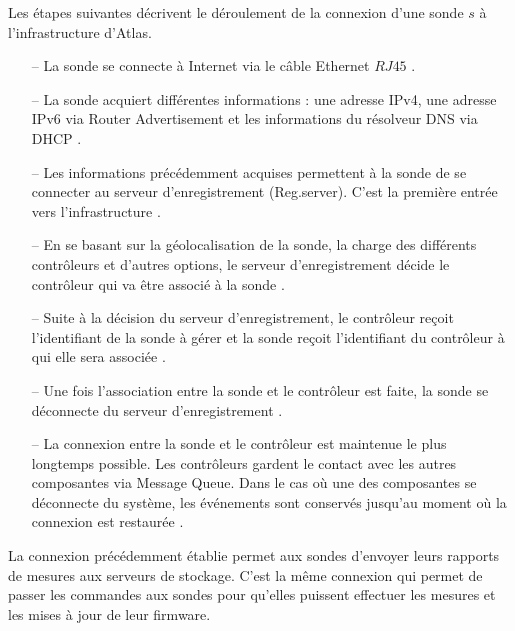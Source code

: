 Les étapes suivantes décrivent le déroulement de la connexion d'une sonde  $s$ à l'infrastructure  d'Atlas. 
\begin{itemize}
	\item[--] La sonde  se connecte à Internet via  le câble Ethernet $RJ45$ .
	\item[--] La sonde  acquiert différentes informations : une adresse IPv4, une adresse IPv6 via Router Advertisement et les informations du résolveur DNS via DHCP . 
	
	\item[--] Les informations précédemment acquises permettent à la sonde  de se connecter  au serveur d'enregistrement (Reg.server). C'est la première entrée vers l'infrastructure .
	
	\item[--] En se basant sur la géolocalisation de la sonde, la charge des différents contrôleurs et d'autres options,  le serveur d'enregistrement décide le contrôleur qui va  être associé à la sonde  . 
	
	\item[--] Suite à la décision du serveur d'enregistrement, le contrôleur reçoit l'identifiant de la sonde  à gérer et la sonde  reçoit l'identifiant du contrôleur  à qui elle sera associée .
	
	\item[--]  Une fois l'association entre la sonde  et le contrôleur est faite,  la sonde  se déconnecte du serveur d'enregistrement .
	
	\item[--] La connexion entre la sonde  et le contrôleur est  maintenue le plus longtemps possible. Les contrôleurs gardent le contact avec les autres composantes via Message Queue. Dans le cas où  une des composantes se déconnecte du système, les événements sont conservés jusqu'au moment où la connexion est restaurée .
	
\end{itemize}

La connexion précédemment établie permet aux sondes  d'envoyer leurs  rapports de mesures  aux serveurs de stockage. C'est la même connexion qui permet de passer les commandes aux sondes pour qu'elles puissent effectuer les mesures et les mises à jour de leur firmware.








